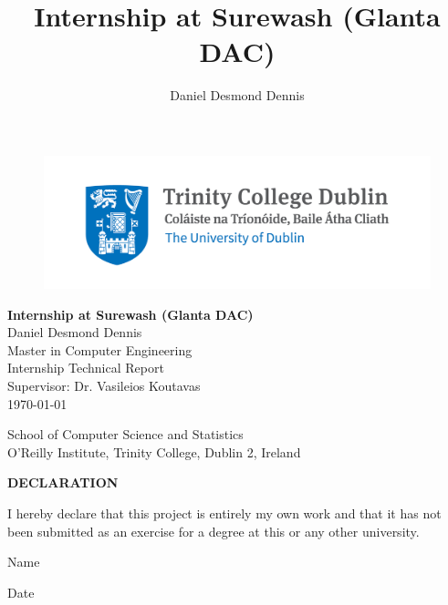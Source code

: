 \begin{center}
    \title{Internship at Surewash (Glanta DAC)}
    \author{Daniel Desmond Dennis}

    \begin{figure}
        \includegraphics[width=\linewidth]{../img/tcd_logo.jpg}
    \end{figure}
    \vspace*{1.0in}
    {\Huge \bfseries
    Internship at Surewash (Glanta DAC)\\
    }
    \vspace*{1.0in}
    {
    Daniel Desmond Dennis\\
    Master in Computer Engineering\\
    Internship Technical Report\\
    Supervisor: Dr. Vasileios Koutavas\\
    \today {}
    }

    \setcounter{section}{0}

    \vfill

    {\Large
    School of Computer Science and Statistics\\

    O’Reilly Institute, Trinity College, Dublin 2, Ireland
    }

\end{center}

\newpage

\begin{center}
{\bfseries \large DECLARATION}\\
\end{center}
\vspace*{0.5in}
I hereby declare that this project is entirely my own work and that it has not been submitted as an exercise for a degree at this or any other university.
\vspace*{0.5in}

\newcommand*\wildcard[2][5cm]{\vspace*{2cm}\parbox{#1}{\hrulefill\par#2}}

\begingroup
  \centering
  \wildcard{Name}
  \hspace{1cm}
  \wildcard{Date}
  \par
\endgroup
